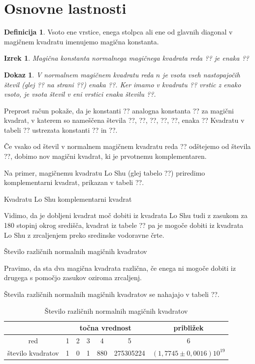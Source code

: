 \documentclass[a4paper,12pt]{article}
\theoremstyle{definition}
\newtheorem{definicija}{Definicija}
\theoremstyle{plain}
\newtheorem{izrek}{Izrek}
\theoremstyle{plain}
\newtheorem{dokaz}{\textbf{Dokaz}}
\begin{document}

\section{Osnovne lastnosti}

\begin{definicija}
   Vsoto ene vrstice, enega stolpca ali ene od glavnih diagonal
   v magičnem kvadratu imenujemo magična konstanta.
\end{definicija}

\begin{izrek}
   Magična konstanta normalnega magičnega kvadrata reda ??
   je enaka
   ??
\end{izrek}
  
\begin{dokaz}
   V normalnem magičnem kvadratu reda $n$ je vsota vseh nastopajočih
   števil (glej ?? na strani ??) enaka
   ??. Ker imamo
   v kvadratu ?? vrstic z enako vsoto, je vsota števil v eni vrstici
   enaka številu ??.
\end{dokaz}

Preprost račun pokaže, da je konstanti ?? analogna konstanta
?? za magični kvadrat, v katerem so nameščena števila
??, ??, ??, ??, ??, enaka
??
Kvadratu v tabeli ?? ustrezata konstanti ?? in ??.

   Če vsako od števil v normalnem magičnem kvadratu reda ?? odštejemo
   od števila ??, dobimo nov magični kvadrat, ki je prvotnemu
   komplementaren.

Na primer, magičnemu kvadratu Lo Shu (glej tabelo ??) priredimo
komplementarni kvadrat, prikazan v tabeli ??.

Kvadratu Lo Shu komplementarni kvadrat

Vidimo, da je dobljeni kvadrat moč dobiti iz kvadrata Lo Shu tudi z zasukom za
180 stopinj okrog središča, kvadrat iz tabele ?? pa je mogoče dobiti
iz kvadrata Lo Shu z zrcaljenjem preko sredinske vodoravne črte.

Število različnih normalnih magičnih kvadratov

   Pravimo, da sta dva magična kvadrata različna, če enega ni mogoče dobiti
   iz drugega s pomočjo zasukov oziroma zrcaljenj.

Števila različnih normalnih magičnih kvadratov se nahajajo v tabeli ??.
\begin{table}[!ht]
   \centering
   \caption{Število različnih normalnih magičnih kvadratov}
   \begin{tabular}{|c|c|c|c|c|c|c|}
      \hline
      & \multicolumn{5}{c}{točna vrednost} & približek      \\ \hline
      red & 1 & 2 & 3 & 4 & 5 & 6                           \\ \hline
      število kvadratov & 1 & 0 & 1 & 880 & 275305224 & 
      $ (1,7745 \pm 0,0016) 10^{19} $                          \\ \hline
   \end{tabular}
\end{table}
\end{document}
